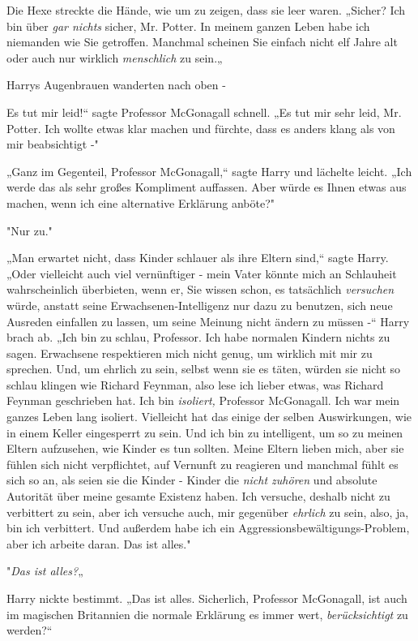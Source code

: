 {Die Hexe streckte die Hände, wie um zu zeigen, dass sie leer waren. „Sicher? Ich bin über \emph{gar nichts} sicher, Mr. Potter. In meinem ganzen Leben habe ich niemanden wie Sie getroffen. Manchmal scheinen Sie einfach nicht elf Jahre alt oder auch nur wirklich \emph{menschlich} zu sein.„

Harrys Augenbrauen wanderten nach oben -

Es tut mir leid!“ sagte Professor McGonagall schnell. „Es tut mir sehr leid, Mr. Potter. Ich wollte etwas klar machen und fürchte, dass es anders klang als von mir beabsichtigt -"

„Ganz im Gegenteil, Professor McGonagall,“ sagte Harry und lächelte leicht. „Ich werde das als sehr großes Kompliment auffassen. Aber würde es Ihnen etwas aus machen, wenn ich eine alternative Erklärung anböte?"

"Nur zu."

„Man erwartet nicht, dass Kinder schlauer als ihre Eltern sind,“ sagte Harry. „Oder vielleicht auch viel vernünftiger - mein Vater könnte mich an Schlauheit wahrscheinlich überbieten, wenn er, Sie wissen schon, es tatsächlich \emph{versuchen} würde, anstatt seine Erwachsenen-Intelligenz nur dazu zu benutzen, sich neue Ausreden einfallen zu lassen, um seine Meinung nicht ändern zu müssen -“ Harry brach ab. „Ich bin zu schlau, Professor. Ich habe normalen Kindern nichts zu sagen. Erwachsene respektieren mich nicht genug, um wirklich mit mir zu sprechen. Und, um ehrlich zu sein, selbst wenn sie es täten, würden sie nicht so schlau klingen wie Richard Feynman, also lese ich lieber etwas, was Richard Feynman geschrieben hat. Ich bin \emph{isoliert,} Professor McGonagall. Ich war mein ganzes Leben lang isoliert. Vielleicht hat das einige der selben Auswirkungen, wie in einem Keller eingesperrt zu sein. Und ich bin zu intelligent, um so zu meinen Eltern aufzusehen, wie Kinder es tun sollten. Meine Eltern lieben mich, aber sie fühlen sich nicht verpflichtet, auf Vernunft zu reagieren und manchmal fühlt es sich so an, als seien sie die Kinder - Kinder die \emph{nicht zuhören} und absolute Autorität über meine gesamte Existenz haben. Ich versuche, deshalb nicht zu verbittert zu sein, aber ich versuche auch, mir gegenüber \emph{ehrlich} zu sein, also, ja, bin ich verbittert. Und außerdem habe ich ein Aggressionsbewältigungs-Problem, aber ich arbeite daran. Das ist alles."

"\emph{Das ist alles?}„

Harry nickte bestimmt. „Das ist alles. Sicherlich, Professor McGonagall, ist auch im magischen Britannien die normale Erklärung es immer wert, \emph{berücksichtigt} zu werden?“

}

